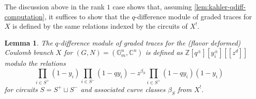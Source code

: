 \documentclass[reqno]{amsart}
\numberwithin{equation}{section}
\numberwithin{equation}{section}
\numberwithin{equation}{section}
\newtheorem{lemma}[thm]{Lemma}
\theoremstyle{definition}
\theoremstyle{remark}
\theoremstyle{remark}
\begin{document}
The discussion above in the rank $1$ case shows that, assuming \cref{lem:kahler-qdiff-computation}, it suffices to show that the $q$-difference module of graded traces for $X$ is defined by the same relations indexed by the circuits of $X^!$. 

\begin{lemma}\label{lem:trace-qdiff-computation}
    The $q$-difference module of graded traces for the (flavor deformed) Coulomb branch $X$  for $(G,N) = (\mathbb{G}_m^n, \mathbb{C}^n)$ is defined as $\mathbb{Z}[q^\pm][y^\pm_i][\![z^d]\!]$ modulo the relations
 \begin{equation}
        \prod_{i \in S^+} (1-y_i) \prod_{i \in S^-} (1-q y_i) - z^{\beta_S} \prod_{i \in S^+} (1-q y_i ) (1-y_i)
    \end{equation} 
    for circuits $S = S^+ \sqcup S^-$ and associated curve classes $\beta_S$ from $X^!$.
\end{lemma}
\end{document}
